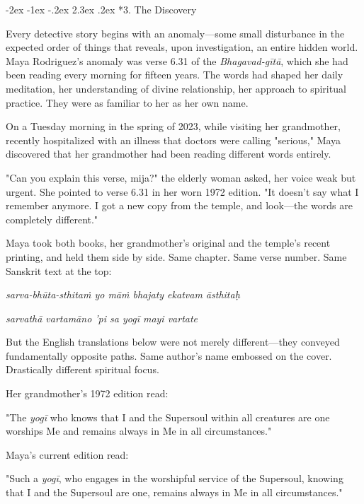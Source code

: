 \documentclass[12pt,twoside]{book}
\makeatletter
\renewcommand\section{\@startsection{section}{1}{\z@}%
{-3.5ex \@plus -1ex \@minus -.2ex}%
{2.3ex \@plus.2ex}%
{\normalfont\Large\bfseries}}
\let\oldsection\section
\renewcommand{\section}[1]{\needspace{4\baselineskip}\oldsection{#1}}
\def\cleardoublepage{\clearpage\if@twoside \ifodd\c@page\else\hbox{}\thispagestyle{empty}\newpage\if@twocolumn\hbox{}\newpage\fi\fi\fi}
\renewcommand\section{\@startsection{section}{1}{\z@}%
{-2ex \@plus -1ex \@minus -.2ex}%
{2.3ex \@plus.2ex}%
{\normalfont\Large\bfseries}}
\makeatother
\begin{document}
\cleardoublepage
\vspace*{0.20\textheight}
\section*{3. The Discovery}
\thispagestyle{chapterpage}

\normalfont\justifying
Every detective story begins with an anomaly—some small disturbance in the expected order of things that reveals, upon investigation, an entire hidden world. Maya Rodriguez's anomaly was verse 6.31 of the \emph{Bhagavad-gītā}, which she had been reading every morning for fifteen years. The words had shaped her daily meditation, her understanding of divine relationship, her approach to spiritual practice. They were as familiar to her as her own name.

On a Tuesday morning in the spring of 2023, while visiting her grandmother, recently hospitalized with an illness that doctors were calling "serious," Maya discovered that her grandmother had been reading different words entirely.

"Can you explain this verse, mija?" the elderly woman asked, her voice weak but urgent. She pointed to verse 6.31 in her worn 1972 edition. "It doesn't say what I remember anymore. I got a new copy from the temple, and look—the words are completely different."

Maya took both books, her grandmother's original and the temple's recent printing, and held them side by side. Same chapter. Same verse number. Same Sanskrit text at the top:

\emph{sarva-bhūta-sthitaṁ yo māṁ bhajaty ekatvam āsthitaḥ}

\emph{sarvathā vartamāno 'pi sa yogī mayi vartate}

But the English translations below were not merely different—they conveyed fundamentally opposite paths. Same author's name embossed on the cover. Drastically different spiritual focus.

Her grandmother's 1972 edition read:

"The \emph{yogī} who knows that I and the Supersoul within all creatures are one worships Me and remains always in Me in all circumstances."

Maya's current edition read:

"Such a \emph{yogī}, who engages in the worshipful service of the Supersoul, knowing that I and the Supersoul are one, remains always in Me in all circumstances."
\end{document}
